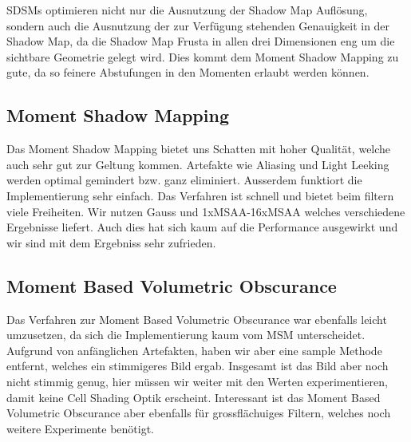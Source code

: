 \documentclass[runningheaders,a4paper]{llncs}
\begin{document}
SDSMs optimieren nicht nur die Ausnutzung der Shadow Map Auflösung, sondern auch die Ausnutzung der zur Verfügung stehenden Genauigkeit in der Shadow Map, da die Shadow Map Frusta in allen drei Dimensionen eng um die sichtbare Geometrie gelegt wird.
Dies kommt dem Moment Shadow Mapping zu gute, da so feinere Abstufungen in den Momenten erlaubt werden können.


\subsection{Moment Shadow Mapping}
Das Moment Shadow Mapping bietet uns Schatten mit hoher Qualität, welche auch sehr gut zur Geltung kommen. Artefakte wie Aliasing und Light Leeking werden optimal gemindert bzw. ganz eliminiert. Ausserdem funktiort die Implementierung sehr einfach. Das Verfahren ist schnell und bietet beim filtern viele Freiheiten. Wir nutzen Gauss und 1xMSAA-16xMSAA welches verschiedene Ergebnisse liefert.
Auch dies hat sich kaum auf die Performance ausgewirkt und wir sind mit dem Ergebniss sehr zufrieden.

\subsection{Moment Based Volumetric Obscurance}
Das Verfahren zur Moment Based Volumetric Obscurance war ebenfalls leicht umzusetzen, da sich die Implementierung kaum vom MSM unterscheidet. Aufgrund von anfänglichen Artefakten, haben wir aber eine sample Methode entfernt, welches ein stimmigeres Bild ergab. Insgesamt ist das Bild aber noch nicht stimmig genug, hier müssen wir weiter mit den Werten experimentieren, damit keine Cell Shading Optik erscheint. Interessant ist das Moment Based Volumetric Obscurance aber ebenfalls für grossflächuiges Filtern, welches noch weitere Experimente benötigt.





\end{document}
